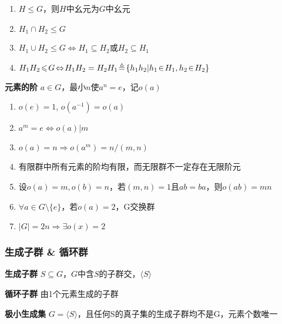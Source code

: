 \documentclass[b4paper, 10pt]{ctexart}
\newcommand*{\impl}{\Rightarrow}
\renewcommand*{\iff}{\Leftrightarrow}
\renewcommand*{\leq}{\leqslant}
\newcommand*{\gengroup}[1]{\langle #1 \rangle}
\begin{document}
\begin{multicols}{3}
    \begin{theorem}[子群运算律($H_1, H_2 \!\leq\! G$)]
        \hfil

        \begin{enumerate}
            \item $H \!\leq\! G$，则$H$中幺元为$G$中幺元
            \item $H_1 \!\cap\! H_2 \!\leq\! G$
            \item $H_1 \!\cup\! H_2 \!\leq\! G \!\iff\! H_1 \!\subseteq\! H_2 $或$H_2 \!\subseteq\! H_1$
            \item $H_1 H_2 \!\leq\! G \!\iff\! H_1 H_2 = H_2 H_1 \\ \!\triangleq\! \{h_1h_2 | h_1 \!\in\! H_1, h_2 \!\in\! H_2\}$
        \end{enumerate}
    \end{theorem}

    \textbf{元素的阶} $a \!\in\! G$，最小$n$使$a^n \!=\! e$，记$o(a)$

    \begin{theorem}[阶的性质]
        \hfil

        \begin{enumerate}
            \item $o(e) = 1$, $o(a^{-1}) = o(a)$
            \item $a^m = e \iff o(a) | m$
            \item $o(a)=n \!\impl\! o(a^m)=n/(m,n)$
            \item 有限群中所有元素的阶均有限，而无限群不一定存在无限阶元
            \item 设$o(a) = m, o(b) = n$，若$(m, n) = 1$且$ab = ba$，则$o(ab) = mn$
            \item $\forall a \!\in\! G \!\setminus\! \{e\}$，若$o(a) = 2$，G交换群
            \item $|G| = 2n \impl \exists o(x) = 2$
        \end{enumerate}
    \end{theorem}

    \subsubsection{生成子群 \& 循环群}

    \textbf{生成子群} $S \!\subseteq\! G$，$G$中含$S$的子群交，$\gengroup{S}$

    \textbf{循环子群} 由1个元素生成的子群

    \textbf{极小生成集} $G \! = \! \gengroup{S}$，且任何S的真子集的生成子群均不是G，元素个数唯一


\end{multicols}
\end{document}
